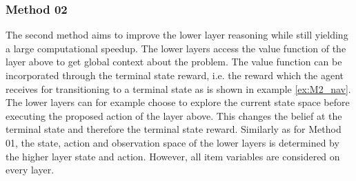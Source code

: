 \subsubsection{Method 02}\label{subsec:M2}
The second method aims to improve the lower layer reasoning while still yielding a large computational speedup. The lower layers access the value function of the layer above to get global context about the problem. The value function can be incorporated through the terminal state reward, i.e. the reward which the agent receives for transitioning to a terminal state as is shown in example \ref{ex:M2_nav}. The lower layers can for example choose to explore the current state space before executing the proposed action of the layer above. This changes the belief at the terminal state and therefore the terminal state reward. Similarly as for Method 01, the state, action and observation space of the lower layers is determined by the higher layer state and action. However, all item variables are considered on every layer.

